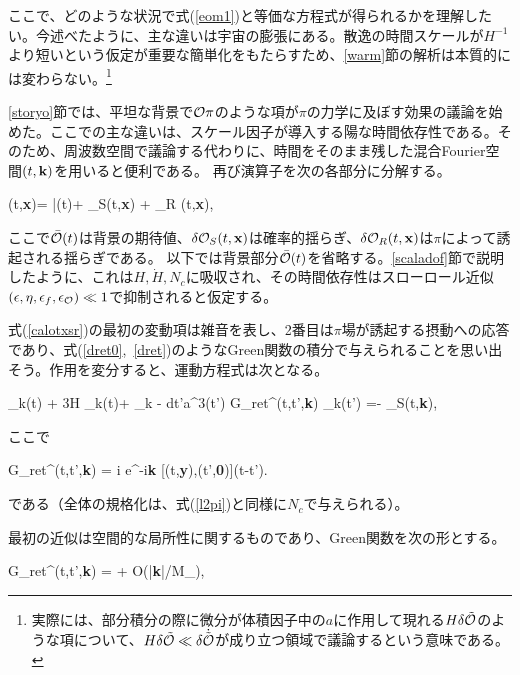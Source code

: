 ここで、どのような状況で式(\ref{eom1})と等価な方程式が得られるかを理解したい。今述べたように、主な違いは宇宙の膨張にある。散逸の時間スケールが$H^{-1}$より短いという仮定が重要な簡単化をもたらすため、\ref{warm}節の解析は本質的には変わらない。\footnote{実際には、部分積分の際に微分が体積因子中の$a$に作用して現れる$H\delta\tilde{{\cal O}}$のような項について、$H\delta\tilde{{\cal O}}\ll\delta\dot{\tilde{{\cal O}}}$が成り立つ領域で議論するという意味である。}

\label{localapp}

\ref{storyo}節では、平坦な背景で${\cal O}\pi$のような項が$\pi$の力学に及ぼす効果の議論を始めた。ここでの主な違いは、スケール因子が導入する陽な時間依存性である。そのため、周波数空間で議論する代わりに、時間をそのまま残した混合Fourier空間$(t,{\bf k})$を用いると便利である。
再び演算子を次の各部分に分解する。

\beq
\label{calotxsr}
\calo (t,{\bf x})= \bar\calo(t)+ \delta\calo_S(t,{\bf x}) + \delta\calo_R (t,{\bf x}),
\eeq

ここで$\bar{{\cal O}}(t)$は背景の期待値、$\delta{\cal O}_S(t,{\bf x})$は確率的揺らぎ、$\delta{\cal O}_R(t,{\bf x})$は$\pi$によって誘起される揺らぎである。
以下では背景部分$\bar{{\cal O}}(t)$を省略する。\ref{scaladof}節で説明したように、これは$H,\dot H,N_c$に吸収され、その時間依存性はスローロール近似$(\epsilon,\eta,\epsilon_f,\epsilon_{{\cal O}})\ll1$で抑制されると仮定する。

式(\ref{calotxsr})の最初の変動項は雑音を表し、2番目は$\pi$場が誘起する摂動への応答であり、式(\ref{dret0},~\ref{dret})のようなGreen関数の積分で与えられることを思い出そう。作用を変分すると、運動方程式は次となる。

\beq
\label{gnoa0}
\ddot\pi_k(t) + 3H \dot\pi_k(t)+  \pi_k -
\int dt'a^3(t') G_{\rm ret}^\calo(t,t',{\bf k}) \pi_{k}(t') =-  \delta\calo_S(t,{\bf k}),
\eeq

ここで

\beq
\label{gnoa1}
G_{\rm ret}^\calo(t,t',{\bf k})  = i \int {} e^{-i{\bf k}} [\delta\calo(t,{\bf y}),\delta\calo(t',{\bf 0})]\theta(t-t').
\eeq

である（全体の規格化は、式(\ref{l2pi})と同様に$N_c$で与えられる）。

最初の近似は空間的な局所性に関するものであり、Green関数を次の形とする。

\beq
\label{gnoa2}
G_{\rm ret}^\calo(t,t',{\bf k}) =  + O(|{\bf k}|/M_\calo),
\eeq

